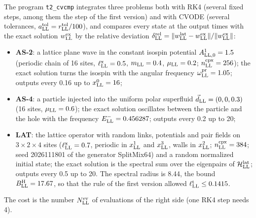 \documentclass[
  10pt,
]{article}
\providecommand{\tightlist}{%
  \setlength{\itemsep}{0pt}\setlength{\parskip}{0pt}}
\begin{document}
The program \texttt{t2\_cvcmp} integrates three problems both with RK4
(several fixed steps, among them the step of the first version) and with
CVODE (several tolerances,
\(a^{\rm tol}_{\rm LL}=r^{\rm tol}_{\rm LL}/100\)), and compares every
state at the output times with the exact solution
\(w^{\rm ex}_{\rm LL}\) by the relative deviation
\(\delta^{\rm rel}_{\rm LL}=\lVert w^{\rm lat}_{\rm LL}-w^{\rm ex}_{\rm LL}\rVert/\lVert w^{\rm ex}_{\rm LL}\rVert\):

\begin{itemize}
\tightlist
\item
  \textbf{AS-2}: a lattice plane wave in the constant isospin potential
  \(A^1_{{\rm LL},0}=1.5\) (periodic chain of 16 sites,
  \(\ell^{\rm x}_{\rm LL}=0.5\), \(m_{\rm LL}=0.4\),
  \(\mu_{\rm LL}=0.2\); \(n^{\rm cpx}_{\rm LL}=256\)); the exact
  solution turns the isospin with the angular frequency
  \(\omega^{\rm pr}_{\rm LL}=1.05\); outputs every 0.16 up to
  \(x^0_{\rm LL}=16\);
\item
  \textbf{AS-4}: a particle injected into the uniform polar superfluid
  \(\vec d_{\rm LL}=(0,0,0.3)\) (16 sites, \(\mu_{\rm LL}=0.6\)); the
  exact solution oscillates between the particle and the hole with the
  frequency \(E^-_{\rm LL}=0.456287\); outputs every 0.2 up to 20;
\item
  \textbf{LAT}: the lattice operator with random links, potentials and
  pair fields on \(3\times2\times4\) sites
  (\(\ell^{\rm x}_{\rm LL}=0.7\), periodic in \(x^1_{\rm LL}\) and
  \(x^3_{\rm LL}\), walls in \(x^2_{\rm LL}\);
  \(n^{\rm cpx}_{\rm LL}=384\); seed 2026111801 of the generator
  SplitMix64) and a random normalized initial state; the exact solution
  is the spectral sum over the eigenpairs of
  \(\mathcal H^{\rm lat}_{\rm LL}\); outputs every 0.5 up to 20. The
  spectral radius is 8.44, the bound \(B^{\rm H}_{\rm LL}=17.67\), so
  that the rule of the first version allowed
  \(\ell^{\rm t}_{\rm LL}\le0.1415\).
\end{itemize}

The cost is the number \(N^{\rm ev}_{\rm LL}\) of evaluations of the
right side (one RK4 step needs 4).
\end{document}
